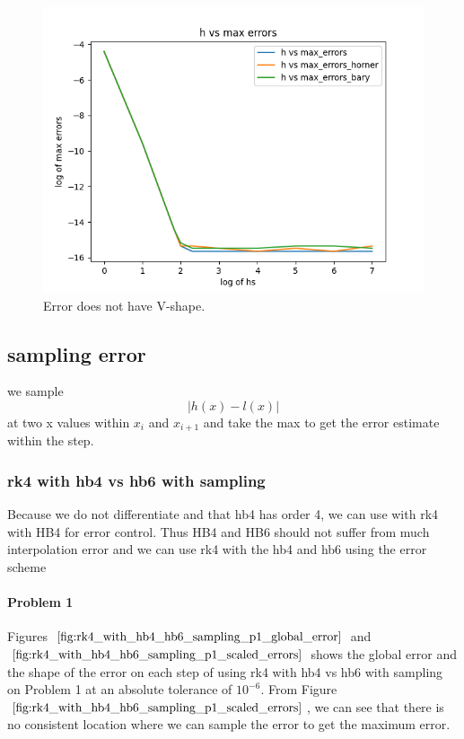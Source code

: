 \begin{figure}[H]
\centering
\includegraphics[width=0.7\linewidth]{./figures/further_work_error_is_not_v_shape_hb6}
\caption{Error does not have V-shape.}
\label{fig:error_is_not_v_shape}
\end{figure}

\subsection{sampling error}
we sample
\begin{equation}
| h(x) - l(x) |
\end{equation}
at two x values within $x_i$ and $x_{i+1}$ and take the max to get the error estimate within the step.

\subsubsection{rk4 with hb4 vs hb6 with sampling}
Because we do not differentiate and that hb4 has order 4, we can use with rk4 with HB4 for error control. Thus HB4 and HB6 should not suffer from much interpolation error and we can use rk4 with the hb4 and hb6 using the error scheme

\paragraph{Problem 1} Figures $\ref{fig:rk4_with_hb4_hb6_sampling_p1_global_error}$ and $\ref{fig:rk4_with_hb4_hb6_sampling_p1_scaled_errors}$ shows the global error and the shape of the error on each step of using rk4 with hb4 vs hb6 with sampling on Problem 1 at an absolute tolerance of $10^{-6}$. From Figure $\ref{fig:rk4_with_hb4_hb6_sampling_p1_scaled_errors}$, we can see that there is no consistent location where we can sample the error to get the maximum error.


